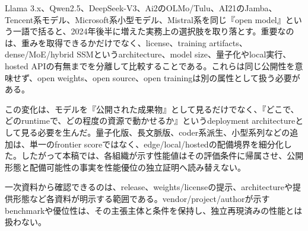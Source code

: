 
Llama 3.x、Qwen2.5、DeepSeek-V3、Ai2のOLMo/Tulu、AI21のJamba、Tencent系モデル、Microsoft系小型モデル、Mistral系を同じ『open model』という一語で括ると、2024年後半に増えた実務上の選択肢を取り落とす。重要なのは、重みを取得できるかだけでなく、license、training artifacts、dense/MoE/hybrid SSMというarchitecture、model size、量子化やlocal実行、hosted APIの有無までを分離して比較することである。これらは同じ公開性を意味せず、open weights、open source、open trainingは別の属性として扱う必要がある。\autocite{src-042479f9308f,src-16b95c7a8737,src-24aefc391976,src-5b3150b68247,src-7882832e3ea8,src-8f8555b73e1b,src-9d854c1d7239,src-ae11d62632e2,src-dabb3f4afb75,src-e40065b96e7c,src-e8f0a037900e}


この変化は、モデルを『公開された成果物』として見るだけでなく、『どこで、どのruntimeで、どの程度の資源で動かせるか』というdeployment architectureとして見る必要を生んだ。量子化版、長文脈版、coder系派生、小型系列などの追加は、単一のfrontier scoreではなく、edge/local/hostedの配備境界を細分化した。したがって本稿では、各組織が示す性能値はその評価条件に帰属させ、公開形態と配備可能性の事実を性能優位の独立証明へ読み替えない。\autocite{src-22a7228f1409,src-bcbc025369e3,src-ecac5d71389f,src-ee43656ed6da}


\begin{claimboundary}
一次資料から確認できるのは、release、weights/licenseの提示、architectureや提供形態など各資料が明示する範囲である。vendor/project/authorが示すbenchmarkや優位性は、その主張主体と条件を保持し、独立再現済みの性能とは扱わない。\autocite{src-8f8555b73e1b}
\end{claimboundary}
